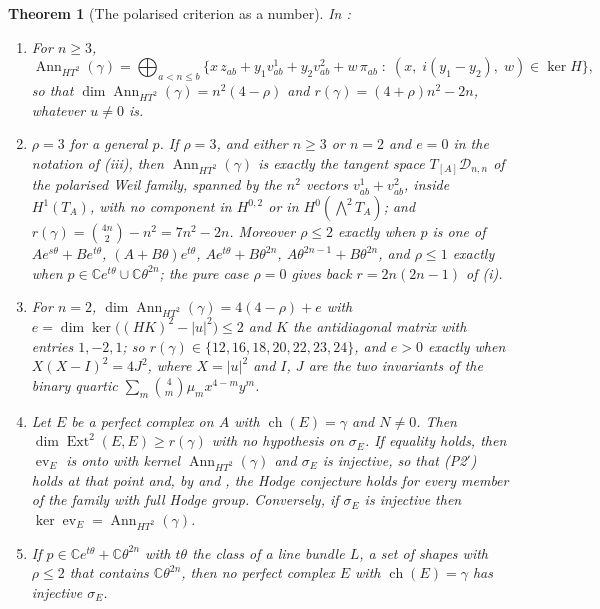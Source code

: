\documentclass[11pt,reqno]{amsart}
\theoremstyle{plain}
\newtheorem{theorem}{Theorem}[section]
\theoremstyle{definition}
\theoremstyle{remark}
\newcommand{\CC}{\mathbb{C}}
\newcommand{\cD}{\mathcal{D}}
\DeclareMathOperator{\ch}{ch}
\DeclareMathOperator{\Ext}{Ext}
\DeclareMathOperator{\Ann}{Ann}
\begin{document}
\begin{theorem}[The polarised criterion as a number]\label{thm:p2primenumber}
In :
\begin{enumerate}[label=\textup{(\roman*)},leftmargin=2.6em,itemsep=2pt]
\item For $n\ge3$,
  \[
    \Ann_{HT^{2}}(\gamma)=\bigoplus_{a<n\le b}
    \bigl\{x\,z_{ab}+y_{1}v^{1}_{ab}+y_{2}v^{2}_{ab}+w\,\pi_{ab}\;:\;
      (x,\;i(y_{1}-y_{2}),\;w)\in\ker H\bigr\},
  \]
  so that $\dim\Ann_{HT^{2}}(\gamma)=n^{2}(4-\rho)$ and
  $r(\gamma)=(4+\rho)n^{2}-2n$, whatever $u\ne0$ is.
\item $\rho=3$ for a general $p$. If $\rho=3$, and either $n\ge3$ or $n=2$ and
  $e=0$ in the notation of (iii), then $\Ann_{HT^{2}}(\gamma)$ is exactly
  the tangent space $T_{[A]}\cD_{n,n}$ of the polarised Weil family, spanned
  by the $n^{2}$ vectors $v^{1}_{ab}+v^{2}_{ab}$, inside $H^{1}(T_{A})$, with
  no component in $H^{0,2}$ or in $H^{0}(\bigwedge^{2}T_{A})$; and
  $r(\gamma)=\binom{4n}{2}-n^{2}=7n^{2}-2n$. Moreover $\rho\le2$ exactly when
  $p$ is one of $Ae^{s\theta}+Be^{t\theta}$, $(A+B\theta)e^{t\theta}$,
  $Ae^{t\theta}+B\theta^{2n}$, $A\theta^{2n-1}+B\theta^{2n}$, and $\rho\le1$
  exactly when $p\in\CC e^{t\theta}\cup\CC\theta^{2n}$; the pure case
  $\rho=0$ gives back $r=2n(2n-1)$ of (i).
\item For $n=2$, $\dim\Ann_{HT^{2}}(\gamma)=4(4-\rho)+e$ with
  $e=\dim\ker\bigl((HK)^{2}-|u|^{2}\bigr)\le2$ and $K$ the antidiagonal
  matrix with entries $1,-2,1$; so $r(\gamma)\in\{12,16,18,20,22,23,24\}$,
  and $e>0$ exactly when $X(X-I)^{2}=4J^{2}$, where $X=|u|^{2}$ and $I$, $J$
  are the two invariants of the binary quartic
  $\sum_{m}\binom{4}{m}\mu_{m}x^{4-m}y^{m}$.
\item Let $E$ be a perfect complex on $A$ with $\ch(E)=\gamma$ and $N\ne0$.
  Then $\dim\Ext^{2}(E,E)\ge r(\gamma)$ with no hypothesis on $\sigma_{E}$.
  If equality holds, then $\operatorname{ev}_{E}$ is onto with kernel
  $\Ann_{HT^{2}}(\gamma)$ and $\sigma_{E}$ is injective, so that
  \textup{(P2$'$)} holds at that point and, by  and
  , the Hodge conjecture holds for every member of
  the family with full Hodge group. Conversely, if $\sigma_{E}$ is injective
  then $\ker\operatorname{ev}_{E}=\Ann_{HT^{2}}(\gamma)$.
\item If $p\in\CC e^{t\theta}+\CC\theta^{2n}$ with $t\theta$ the class of a line
  bundle $L$, a set of shapes with $\rho\le2$ that contains
  $\CC\theta^{2n}$, then no perfect complex $E$ with $\ch(E)=\gamma$ has
  injective $\sigma_{E}$.
\end{enumerate}
\end{theorem}
\end{document}
